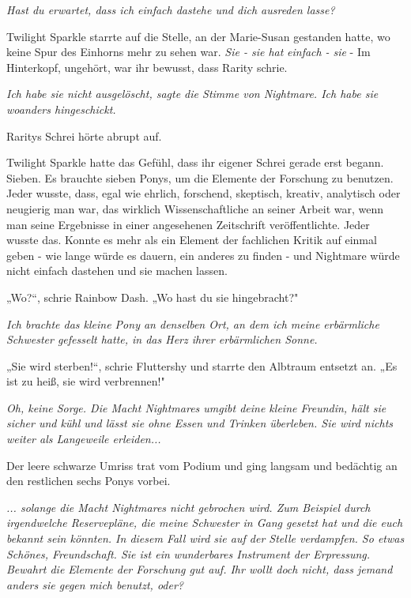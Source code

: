 {\emph{\emph{Hast du erwartet, dass ich einfach dastehe und dich ausreden lasse?}}

Twilight Sparkle starrte auf die Stelle, an der Marie-Susan gestanden hatte, wo keine Spur des Einhorns mehr zu sehen war. \emph{Sie - sie hat} \emph{einfach} \emph{- sie} - Im Hinterkopf, ungehört, war ihr bewusst, dass Rarity schrie.

\emph{\emph{Ich habe sie nicht ausgelöscht}, sagte die Stimme von Nightmare. \emph{Ich habe sie woanders hingeschickt.}}

Raritys Schrei hörte abrupt auf.

Twilight Sparkle hatte das Gefühl, dass ihr eigener Schrei gerade erst begann. Sieben. Es brauchte sieben Ponys, um die Elemente der Forschung zu benutzen. Jeder wusste, dass, egal wie ehrlich, forschend, skeptisch, kreativ, analytisch oder neugierig man war, das wirklich Wissenschaftliche an seiner Arbeit war, wenn man seine Ergebnisse in einer angesehenen Zeitschrift veröffentlichte. Jeder wusste das. Konnte es mehr als ein Element der fachlichen Kritik auf einmal geben - wie lange würde es dauern, ein anderes zu finden - und Nightmare würde nicht einfach dastehen und sie machen lassen.

„Wo?“, schrie Rainbow Dash. „Wo hast du sie hingebracht?"

\emph{\emph{Ich brachte das kleine Pony an denselben Ort, an dem ich meine erbärmliche Schwester gefesselt hatte, in das Herz ihrer erbärmlichen Sonne.}}

„Sie wird sterben!“, schrie Fluttershy und starrte den Albtraum entsetzt an. „Es ist zu heiß, sie wird verbrennen!"

\emph{\emph{Oh, keine Sorge. Die Macht} \emph{Nightmares} \emph{umgibt deine kleine Freundin, hält sie sicher und kühl und lässt sie ohne Essen und Trinken überleben. Sie wird nichts weiter als Langeweile erleiden...}}

Der leere schwarze Umriss trat vom Podium und ging langsam und bedächtig an den restlichen sechs Ponys vorbei.

\emph{\emph{... solange die Macht} \emph{Nightmares} \emph{nicht gebrochen wird. Zum Beispiel durch irgendwelche Reservepläne, die meine Schwester in Gang gesetzt hat und die euch bekannt sein könnten. In diesem Fall wird sie auf der Stelle verdampfen. So etwas Schönes, Freundschaft. Sie ist ein wunderbares Instrument der Erpressung. Bewahrt die Elemente der Forschung gut auf. Ihr wollt doch nicht, dass jemand anders sie gegen mich benutzt, oder?}}

}
